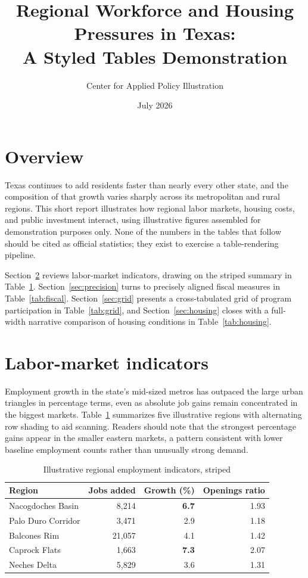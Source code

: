 \documentclass[11pt]{article}
\title{Regional Workforce and Housing Pressures in Texas:\\A Styled Tables Demonstration}
\author{Center for Applied Policy Illustration}
\date{July 2026}
\newcommand{\hi}[1]{\textcolor{tx2036blue}{\textbf{#1}}}
\begin{document}
\maketitle

\section{Overview}

Texas continues to add residents faster than nearly every other state, and
the composition of that growth varies sharply across its metropolitan and
rural regions. This short report illustrates how regional labor markets,
housing costs, and public investment interact, using illustrative figures
assembled for demonstration purposes only. None of the numbers in the
tables that follow should be cited as official statistics; they exist to
exercise a table-rendering pipeline.

Section~\ref{sec:labor} reviews labor-market indicators, drawing on the
striped summary in Table~\ref{tab:labor}. Section~\ref{sec:precision}
turns to precisely aligned fiscal measures in
Table~\ref{tab:fiscal}. Section~\ref{sec:grid} presents a cross-tabulated
grid of program participation in Table~\ref{tab:grid}, and
Section~\ref{sec:housing} closes with a full-width narrative comparison
of housing conditions in Table~\ref{tab:housing}.

\section{Labor-market indicators}\label{sec:labor}

Employment growth in the state's mid-sized metros has outpaced the large
urban triangles in percentage terms, even as absolute job gains remain
concentrated in the biggest markets. Table~\ref{tab:labor} summarizes
five illustrative regions with alternating row shading to aid scanning.
Readers should note that the strongest percentage gains appear in the
smaller eastern markets, a pattern consistent with lower baseline
employment counts rather than unusually strong demand.

\begin{table}[htbp]
  \centering
  \caption{Illustrative regional employment indicators, striped}
  \label{tab:labor}
  \begin{tabular}{lrrr}
    \toprule
    Region & Jobs added & Growth (\%) & Openings ratio \\
    \midrule
    Nacogdoches Basin   & 8{,}214  & \hi{6.7} & 1.93 \\
    Palo Duro Corridor  & 3{,}471  & 2.9      & 1.18 \\
    Balcones Rim        & 21{,}057 & 4.1      & 1.42 \\
    Caprock Flats       & 1{,}663  & \hi{7.3} & 2.07 \\
    Neches Delta        & 5{,}829  & 3.6      & 1.31 \\
    \bottomrule
  \end{tabular}
\end{table}
\end{document}
